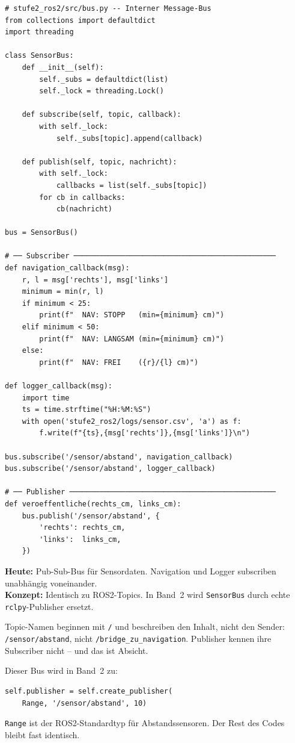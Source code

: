 \begin{lstlisting}[style=python]
# stufe2_ros2/src/bus.py -- Interner Message-Bus
from collections import defaultdict
import threading

class SensorBus:
    def __init__(self):
        self._subs = defaultdict(list)
        self._lock = threading.Lock()

    def subscribe(self, topic, callback):
        with self._lock:
            self._subs[topic].append(callback)

    def publish(self, topic, nachricht):
        with self._lock:
            callbacks = list(self._subs[topic])
        for cb in callbacks:
            cb(nachricht)

bus = SensorBus()

# ── Subscriber ───────────────────────────────────────────────
def navigation_callback(msg):
    r, l = msg['rechts'], msg['links']
    minimum = min(r, l)
    if minimum < 25:
        print(f"  NAV: STOPP   (min={minimum} cm)")
    elif minimum < 50:
        print(f"  NAV: LANGSAM (min={minimum} cm)")
    else:
        print(f"  NAV: FREI    ({r}/{l} cm)")

def logger_callback(msg):
    import time
    ts = time.strftime("%H:%M:%S")
    with open('stufe2_ros2/logs/sensor.csv', 'a') as f:
        f.write(f"{ts},{msg['rechts']},{msg['links']}\n")

bus.subscribe('/sensor/abstand', navigation_callback)
bus.subscribe('/sensor/abstand', logger_callback)

# ── Publisher ────────────────────────────────────────────────
def veroeffentliche(rechts_cm, links_cm):
    bus.publish('/sensor/abstand', {
        'rechts': rechts_cm,
        'links':  links_cm,
    })
\end{lstlisting}

\begin{projektBox}
\textbf{Heute:} Pub-Sub-Bus für Sensordaten. Navigation
und Logger subscriben unabhängig voneinander.\\
\textbf{Konzept:} Identisch zu ROS2-Topics.
In Band~2 wird \texttt{SensorBus} durch echte
\texttt{rclpy}-Publisher ersetzt.
\end{projektBox}

\begin{merksatzBox}
Topic-Namen beginnen mit \texttt{/} und beschreiben den Inhalt,
nicht den Sender: \texttt{/sensor/abstand}, nicht
\texttt{/bridge\_zu\_navigation}. Publisher kennen ihre
Subscriber nicht -- und das ist Absicht.
\end{merksatzBox}

\begin{robotikBox}
Dieser Bus wird in Band~2 zu:
\begin{lstlisting}[style=python]
self.publisher = self.create_publisher(
    Range, '/sensor/abstand', 10)
\end{lstlisting}
\texttt{Range} ist der ROS2-Standardtyp für Abstandssensoren.
Der Rest des Codes bleibt fast identisch.
\end{robotikBox}
